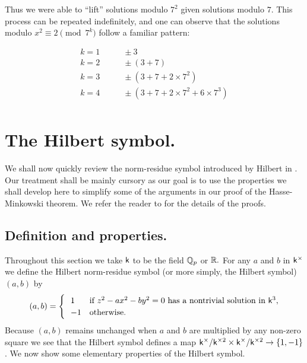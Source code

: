 Thus we were able to ``lift'' solutions modulo \(7^2\) given solutions modulo \(7\). This process can be repeated indefinitely, and one can observe that the solutions modulo \(x^2 \equiv 2 \pmod{7^k}\) follow a familiar pattern:

\begin{align*}
    k = 1 & \qquad \pm 3 \\
    k = 2 & \qquad \pm (3 + 7) \\
    k = 3 & \qquad \pm (3 + 7 + 2 \times 7^2) \\
    k = 4 & \qquad \pm (3 + 7 + 2 \times 7^2 + 6 \times 7^3) \\
\end{align*}

\section{The Hilbert symbol.}\label{sec:hilbert-symbol}

We shall now quickly review the norm-residue symbol introduced by Hilbert in \cite[pp.~286--287]{hilbert1932theorie}. Our treatment shall be mainly cursory as our goal is to use the properties we shall develop here to simplify some of the arguments in our proof of the Hasse-Minkowski theorem. We refer the reader to \cite{serre2012course} for the details of the proofs.

\subsection{Definition and properties.} Throughout this section we take \(\mathsf{k}\) to be the field \(\mathbb{Q}_p\) or \(\mathbb{R}.\) For any \(a\) and \(b\) in \(\mathsf{k}^{\times}\) we define the Hilbert norm-residue symbol (or more simply, the Hilbert symbol) \((a, b)\) by
\[
    (a, b) = \begin{cases}
        \ \ 1 & \text{if } z^2 - ax^2 - by^2 = 0 \text{ has a nontrivial solution in } \mathsf{k}^3, \\
        \ \ -1 & \text{otherwise}.
    \end{cases}
\]
Because \((a, b)\) remains unchanged when \(a\) and \(b\) are multiplied by any non-zero square we see that the Hilbert symbol defines a map \(\mathsf{k}^{\times}/\mathsf{k}^{\times2} \times \mathsf{k}^{\times}/\mathsf{k}^{\times2} \to \{1, -1\}\). We now show some elementary properties of the Hilbert symbol.

